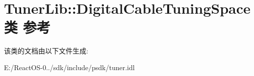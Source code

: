 \hypertarget{class_tuner_lib_1_1_digital_cable_tuning_space}{}\section{Tuner\+Lib\+:\+:Digital\+Cable\+Tuning\+Space类 参考}
\label{class_tuner_lib_1_1_digital_cable_tuning_space}


该类的文档由以下文件生成\+:\begin{DoxyCompactItemize}
\item 
E\+:/\+React\+O\+S-\/0../sdk/include/psdk/tuner.\+idl\end{DoxyCompactItemize}
